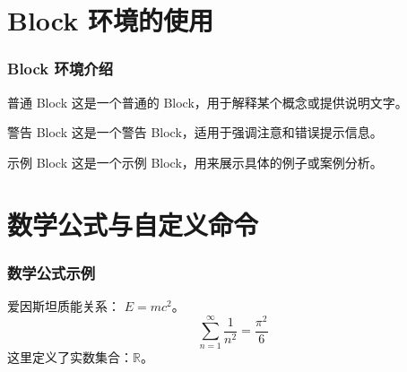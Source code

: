 \documentclass[aspectratio=169]{beamer}
\begin{document}
\section{Block 环境的使用}
\begin{frame}
    \frametitle{Block 环境介绍}
    \begin{block}{普通 Block}
        这是一个普通的 Block，用于解释某个概念或提供说明文字。
    \end{block}
    
    \begin{alertblock}{警告 Block}
        这是一个警告 Block，适用于强调注意和错误提示信息。
    \end{alertblock}
    
    \begin{exampleblock}{示例 Block}
        这是一个示例 Block，用来展示具体的例子或案例分析。
    \end{exampleblock}
\end{frame}

\section{数学公式与自定义命令}
\begin{frame}
    \frametitle{数学公式示例}
    爱因斯坦质能关系： $E = mc^2$。
    \[
    \sum_{n=1}^{\infty} \frac{1}{n^2} = \frac{\pi^2}{6}
    \]
    \newcommand{\Real}{\mathbb{R}}
    这里定义了实数集合：$\Real$。
\end{frame}

\end{document}
